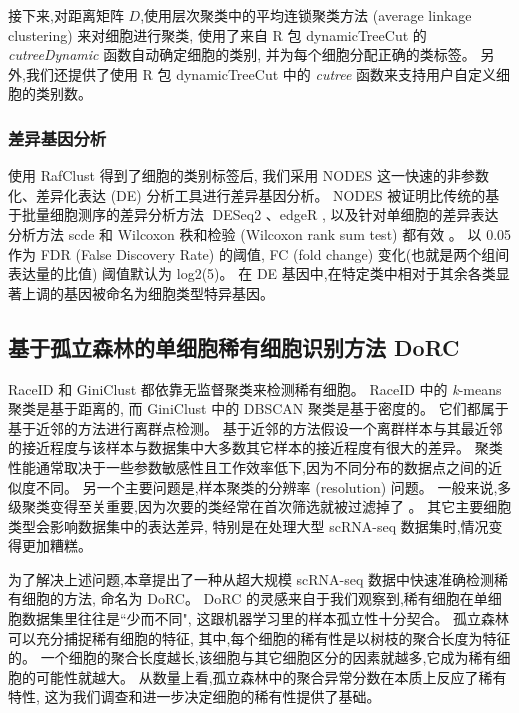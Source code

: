 接下来,对距离矩阵 $D$,使用层次聚类中的平均连锁聚类方法 (average linkage clustering) 来对细胞进行聚类,
使用了来自 R 包 dynamicTreeCut  的 \textit{cutreeDynamic} 函数自动确定细胞的类别,
并为每个细胞分配正确的类标签。
另外,我们还提供了使用 R 包 dynamicTreeCut 中的 \textit{cutree} 函数来支持用户自定义细胞的类别数。

\subsubsection{差异基因分析}
\label{subsec:de}

使用 RafClust 得到了细胞的类别标签后,
我们采用 NODES  这一快速的非参数化、差异化表达 (DE) 分析工具进行差异基因分析。
NODES 被证明比传统的基于批量细胞测序的差异分析方法 DESeq2 、edgeR ,
以及针对单细胞的差异表达分析方法 scde  和 Wilcoxon 秩和检验 (Wilcoxon rank sum test) 都有效 。
以 0.05 作为 FDR (False Discovery Rate) 的阈值, FC (fold change) 变化(也就是两个组间表达量的比值) 阈值默认为 log2(5)。
在 DE 基因中,在特定类中相对于其余各类显著上调的基因被命名为细胞类型特异基因。


\subsection{基于孤立森林的单细胞稀有细胞识别方法 DoRC}
\label{sec:method}

RaceID 和 GiniClust 都依靠无监督聚类来检测稀有细胞。
RaceID 中的 \textit{k}-means 聚类是基于距离的,
而 GiniClust 中的 DBSCAN 聚类是基于密度的。
它们都属于基于近邻的方法进行离群点检测。
基于近邻的方法假设一个离群样本与其最近邻的接近程度与该样本与数据集中大多数其它样本的接近程度有很大的差异。
聚类性能通常取决于一些参数敏感性且工作效率低下,因为不同分布的数据点之间的近似度不同。
另一个主要问题是,样本聚类的分辨率 (resolution) 问题。
一般来说,多级聚类变得至关重要,因为次要的类经常在首次筛选就被过滤掉了 。
其它主要细胞类型会影响数据集中的表达差异,
特别是在处理大型 scRNA-seq 数据集时,情况变得更加糟糕。

为了解决上述问题,本章提出了一种从超大规模 scRNA-seq 数据中快速准确检测稀有细胞的方法,
命名为 DoRC。
DoRC 的灵感来自于我们观察到,稀有细胞在单细胞数据集里往往是``少而不同", 这跟机器学习里的样本孤立性十分契合。
孤立森林可以充分捕捉稀有细胞的特征,
其中,每个细胞的稀有性是以树枝的聚合长度为特征的。
一个细胞的聚合长度越长,该细胞与其它细胞区分的因素就越多,它成为稀有细胞的可能性就越大。
从数量上看,孤立森林中的聚合异常分数在本质上反应了稀有特性,
这为我们调查和进一步决定细胞的稀有性提供了基础。

